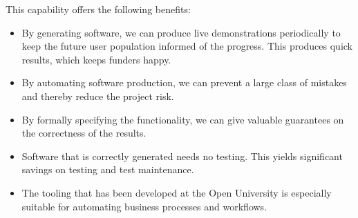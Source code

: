 \documentclass{elsarticle}
\begin{document}
   This capability offers the following benefits:
\begin{itemize}
    \item By generating software, we can produce live demonstrations periodically to keep the future user population informed of the progress.
    This produces quick results, which keeps funders happy.
    \item By automating software production, we can prevent a large class of mistakes and thereby reduce the project risk.
    \item By formally specifying the functionality, we can give valuable guarantees on the correctness of the results.
    \item Software that is correctly generated needs no testing. This yields significant savings on testing and test maintenance.
    \item The tooling that has been developed at the Open University is especially suitable for automating business processes and workflows.
\end{itemize}
\end{document}
